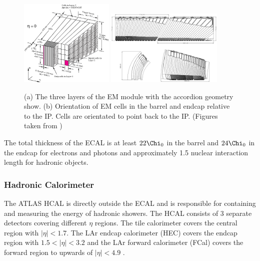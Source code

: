 \begin{figure}[h!]
\centering
\includegraphics[width=0.40\textwidth, angle=0]{figures/LHC_ATLAS/LARG3-TDR-barrelM.eps}
\includegraphics[width=0.50\textwidth, angle=0]{figures/LHC_ATLAS/LARG3-abcdM.eps}
\caption{ (a) The three layers of the EM module with the accordion geometry show. (b) Orientation of EM cells in the barrel and endcap relative to the IP.  Cells are orientated to point back to the IP.  (Figures taken from \cite{ATLAS_JINST}) \label{LHC:fig:EMCalo}}
\end{figure}

\indent The total thickness of the ECAL is at least $22 \Chi_0$ in the barrel and $24 \Chi_0$ in the endcap for electrons and photons and approximately 1.5 nuclear interaction length for hadronic objects. \\

\subsubsection*{Hadronic Calorimeter}

\indent The ATLAS HCAL is directly outside the ECAL and is responsible for containing and measuring the energy of hadronic showers.  The HCAL consists of 3 separate detectors covering different $\eta$ regions. The tile calorimeter covers the central region with $|\eta| < 1.7$.  The LAr endcap calorimeter (HEC) covers the endcap region with $1.5<|\eta| < 3.2$ and the LAr forward calorimeter (FCal) covers the forward region to upwards of $|\eta| < 4.9$ .  \\

